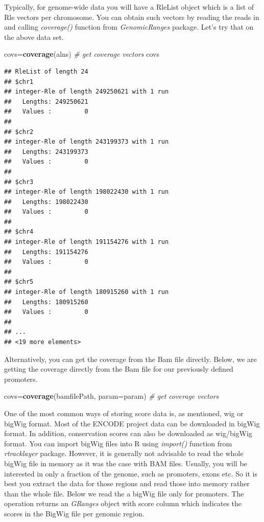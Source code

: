 \documentclass[12pt,]{krantz}
\newenvironment{Shaded}{\begin{snugshade}}{\end{snugshade}}
\newcommand{\CommentTok}[1]{\textcolor[rgb]{0.56,0.35,0.01}{\textit{#1}}}
\newcommand{\DataTypeTok}[1]{\textcolor[rgb]{0.13,0.29,0.53}{#1}}
\newcommand{\KeywordTok}[1]{\textcolor[rgb]{0.13,0.29,0.53}{\textbf{#1}}}
\newcommand{\NormalTok}[1]{#1}
\begin{document}
Typically, for genome-wide data you will have a RleList object which is a list of Rle vectors per chromosome. You can obtain such vectors by reading the reads in and calling \emph{coverage()} function from \emph{GenomicRanges} package. Let's try that on the above data set.

\begin{Shaded}
\begin{Highlighting}[]
\NormalTok{covs=}\KeywordTok{coverage}\NormalTok{(alns) }\CommentTok{# get coverage vectors}
\NormalTok{covs}
\end{Highlighting}
\end{Shaded}

\begin{verbatim}
## RleList of length 24
## $chr1
## integer-Rle of length 249250621 with 1 run
##   Lengths: 249250621
##   Values :         0
## 
## $chr2
## integer-Rle of length 243199373 with 1 run
##   Lengths: 243199373
##   Values :         0
## 
## $chr3
## integer-Rle of length 198022430 with 1 run
##   Lengths: 198022430
##   Values :         0
## 
## $chr4
## integer-Rle of length 191154276 with 1 run
##   Lengths: 191154276
##   Values :         0
## 
## $chr5
## integer-Rle of length 180915260 with 1 run
##   Lengths: 180915260
##   Values :         0
## 
## ...
## <19 more elements>
\end{verbatim}

Alternatively, you can get the coverage from the Bam file directly. Below, we are getting the coverage directly from the Bam file for our previously defined promoters.

\begin{Shaded}
\begin{Highlighting}[]
\NormalTok{covs=}\KeywordTok{coverage}\NormalTok{(bamfilePath, }\DataTypeTok{param=}\NormalTok{param) }\CommentTok{# get coverage vectors}
\end{Highlighting}
\end{Shaded}

One of the most common ways of storing score data is, as mentioned, wig or bigWig format. Most of the ENCODE project data can be downloaded in bigWig format. In addition, conservation scores can also be downloaded as wig/bigWig format. You can import bigWig files into R using \emph{import()} function from \emph{rtracklayer} package. However, it is generally not advisable to read the whole bigWig file in memory as it was the case with BAM files. Usually, you will be interested in only a fraction of the genome, such as promoters, exons etc. So it is best you extract the data for those regions and read those into memory rather than the whole file. Below we read the a bigWig file only for promoters. The operation returns an \emph{GRanges} object with score column which indicates the scores in the BigWig file per genomic region.
\end{document}
